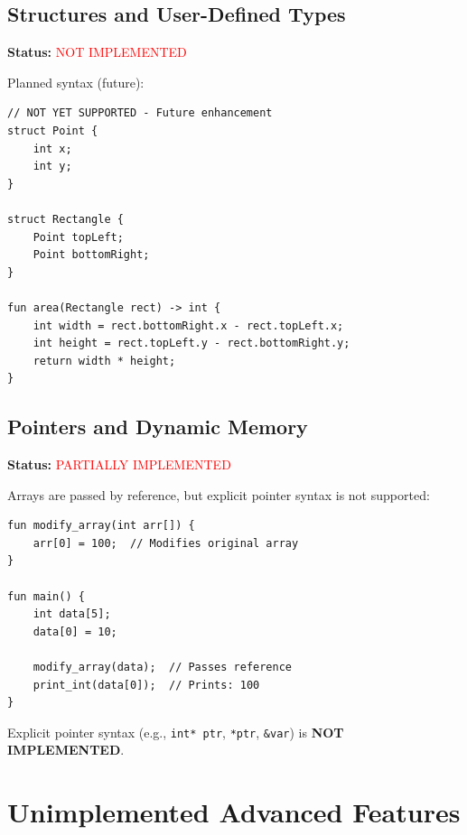 \documentclass[12pt,a4paper,oneside]{book}
\newcommand{\code}[1]{\texttt{#1}}
\begin{document}
\subsection{Structures and User-Defined Types}

\textbf{Status:} \textcolor{red}{NOT IMPLEMENTED}

Planned syntax (future):

\begin{lstlisting}[style=algo, caption={Structures (Planned Feature)}]
// NOT YET SUPPORTED - Future enhancement
struct Point {
    int x;
    int y;
}

struct Rectangle {
    Point topLeft;
    Point bottomRight;
}

fun area(Rectangle rect) -> int {
    int width = rect.bottomRight.x - rect.topLeft.x;
    int height = rect.topLeft.y - rect.bottomRight.y;
    return width * height;
}
\end{lstlisting}

\subsection{Pointers and Dynamic Memory}

\textbf{Status:} \textcolor{red}{PARTIALLY IMPLEMENTED}

Arrays are passed by reference, but explicit pointer syntax is not supported:

\begin{lstlisting}[style=algo, caption={Current Array Reference Behavior}]
fun modify_array(int arr[]) {
    arr[0] = 100;  // Modifies original array
}

fun main() {
    int data[5];
    data[0] = 10;
    
    modify_array(data);  // Passes reference
    print_int(data[0]);  // Prints: 100
}
\end{lstlisting}

Explicit pointer syntax (e.g., \code{int* ptr}, \code{*ptr}, \code{\&var}) is \textbf{NOT IMPLEMENTED}.

\section{Unimplemented Advanced Features}
\end{document}
